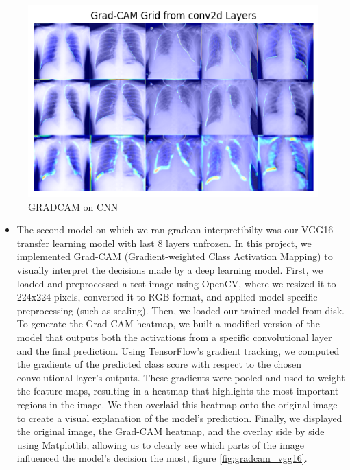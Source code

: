 \documentclass{article}
\begin{document}
\begin{figure}[ht] %
    \centering
    \includegraphics[width=1.0\linewidth]{cnngradcamoutput.png}
    \caption{GRADCAM on CNN}
    \label{fig:gradcam_CNN}
\end{figure}
\begin{itemize}
    \item The second model on which we ran gradcan interpretibilty was our VGG16 transfer learning model with last 8 layers unfrozen. In this project, we implemented Grad-CAM (Gradient-weighted Class Activation Mapping) to visually interpret the decisions made by a deep learning model. First, we loaded and preprocessed a test image using OpenCV, where we resized it to 224x224 pixels, converted it to RGB format, and applied model-specific preprocessing (such as scaling). Then, we loaded our trained model from disk. To generate the Grad-CAM heatmap, we built a modified version of the model that outputs both the activations from a specific convolutional layer and the final prediction. Using TensorFlow's gradient tracking, we computed the gradients of the predicted class score with respect to the chosen convolutional layer's outputs. These gradients were pooled and used to weight the feature maps, resulting in a heatmap that highlights the most important regions in the image. We then overlaid this heatmap onto the original image to create a visual explanation of the model's prediction. Finally, we displayed the original image, the Grad-CAM heatmap, and the overlay side by side using Matplotlib, allowing us to clearly see which parts of the image influenced the model’s decision the most, figure \ref{fig:gradcam_vgg16}.
\end{itemize}
   
\end{document}
